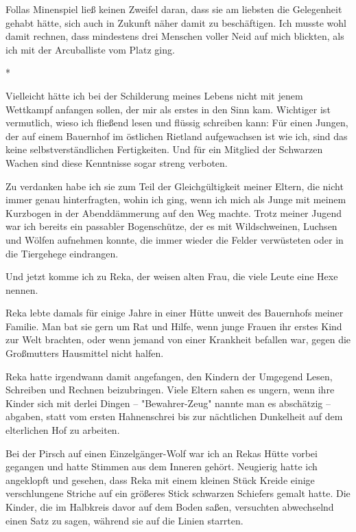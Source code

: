 \documentclass[10pt, a4paper, oneside]{book}
\begin{document}
\begin{multicols}{2}
Follas Minenspiel ließ keinen Zweifel daran, dass sie am liebsten die Gelegenheit gehabt hätte, sich auch in Zukunft näher damit zu beschäftigen. Ich musste wohl damit rechnen, dass mindestens drei Menschen voller Neid auf mich blickten, als ich mit der Arcuballiste vom Platz ging.

\begin{center}
    *
\end{center}

Vielleicht hätte ich bei der Schilderung meines Lebens nicht mit jenem Wettkampf anfangen sollen, der mir als erstes in den Sinn kam. Wichtiger ist vermutlich, wieso ich fließend lesen und flüssig schreiben kann: Für einen Jungen, der auf einem Bauernhof im östlichen Rietland aufgewachsen ist wie ich, sind das keine selbstverständlichen Fertigkeiten. Und für ein Mitglied der Schwarzen Wachen sind diese Kenntnisse sogar streng verboten.

Zu verdanken habe ich sie zum Teil der Gleichgültigkeit meiner Eltern, die nicht immer genau hinterfragten, wohin ich ging, wenn ich mich als Junge mit meinem Kurzbogen in der Abenddämmerung auf den Weg machte. Trotz meiner Jugend war ich bereits ein passabler Bogenschütze, der es mit Wildschweinen, Luchsen und Wölfen aufnehmen konnte, die immer wieder die Felder verwüsteten oder in die Tiergehege eindrangen.

Und jetzt komme ich zu Reka, der weisen alten Frau, die viele Leute eine Hexe
nennen.

Reka lebte damals für einige Jahre in einer Hütte unweit des Bauernhofs meiner Familie. Man bat sie gern um Rat und Hilfe, wenn junge Frauen ihr erstes Kind zur Welt brachten, oder wenn jemand von einer Krankheit befallen war, gegen die Großmutters Hausmittel nicht halfen.

Reka hatte irgendwann damit angefangen, den Kindern der Umgegend Lesen, Schreiben und Rechnen beizubringen. Viele Eltern sahen es ungern, wenn ihre Kinder sich mit derlei Dingen – "Bewahrer-Zeug" nannte man es abschätzig – abgaben, statt vom ersten Hahnenschrei bis zur nächtlichen Dunkelheit auf dem elterlichen Hof zu arbeiten.

Bei der Pirsch auf einen Einzelgänger-Wolf war ich an Rekas Hütte vorbei gegangen und hatte Stimmen aus dem Inneren gehört. Neugierig hatte ich angeklopft und gesehen, dass Reka mit einem kleinen Stück Kreide einige verschlungene Striche auf ein größeres Stick schwarzen Schiefers gemalt hatte. Die Kinder, die im Halbkreis davor auf dem Boden saßen, versuchten abwechselnd einen Satz zu sagen, während sie auf die Linien starrten.


\end{multicols}
\end{document}
